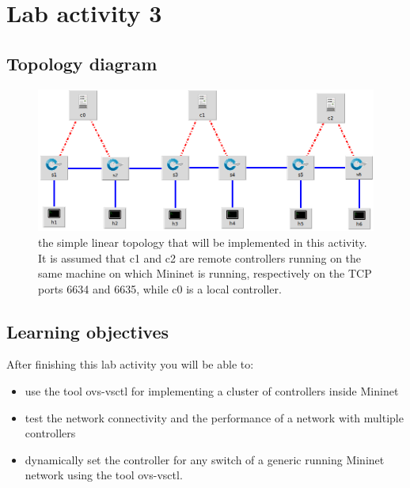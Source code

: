 





\section*{Lab activity 3}
\subsection*{Topology diagram}
\begin{figure}[htb]
	\centering
	\includegraphics[width=1\linewidth]{img/topology-3.png}
	\caption{the simple linear topology that will be implemented in this activity. It is
  assumed that c1 and c2 are remote controllers running on the same machine
  on which Mininet is running, respectively on the TCP ports 6634 and 6635,
  while c0 is a local controller.}
	\label{fig:topology-3}
\end{figure}







\subsection*{Learning objectives}
After finishing this lab activity you will be able to:
\begin{itemize}
  \item use the tool ovs-vsctl for implementing a cluster of controllers inside Mininet
  \item test the network connectivity and the performance of a network with multiple
  controllers
  \item dynamically set the controller for any switch of a generic running Mininet
  network using the tool ovs-vsctl.
\end{itemize}






